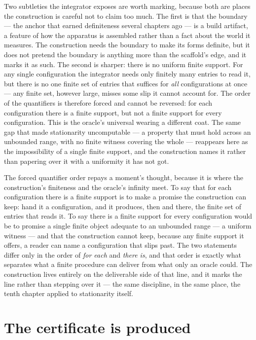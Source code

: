 Two subtleties the integrator exposes are worth marking, because both are places the construction is
careful not to claim too much. The first is that the boundary --- the anchor that earned definiteness
several chapters ago --- is a build artifact, a feature of how the apparatus is assembled rather than a
fact about the world it measures. The construction needs the boundary to make its forms definite, but it
does not pretend the boundary is anything more than the scaffold's edge, and it marks it as such. The
second is sharper: there is no uniform finite support. For any single configuration the integrator needs
only finitely many entries to read it, but there is no one finite set of entries that suffices for
\emph{all} configurations at once --- any finite set, however large, misses some slip it cannot account
for. The order of the quantifiers is therefore forced and cannot be reversed: for each configuration
there is a finite support, but not a finite support for every configuration. This is the oracle's
universal wearing a different coat. The same gap that made stationarity uncomputable --- a property that
must hold across an unbounded range, with no finite witness covering the whole --- reappears here as the
impossibility of a single finite support, and the construction names it rather than papering over it
with a uniformity it has not got.

The forced quantifier order repays a moment's thought, because it is where the construction's finiteness
and the oracle's infinity meet. To say that for each configuration there is a finite support is to make a
promise the construction can keep: hand it a configuration, and it produces, then and there, the finite
set of entries that reads it. To say there is a finite support for every configuration would be to
promise a single finite object adequate to an unbounded range --- a uniform witness --- and that the
construction cannot keep, because any finite support it offers, a reader can name a configuration that
slips past. The two statements differ only in the order of \emph{for each} and \emph{there is}, and that
order is exactly what separates what a finite procedure can deliver from what only an oracle could. The
construction lives entirely on the deliverable side of that line, and it marks the line rather than
stepping over it --- the same discipline, in the same place, the tenth chapter applied to stationarity
itself.

\section{The certificate is produced}
\label{se:the-certificate-is-produced}

